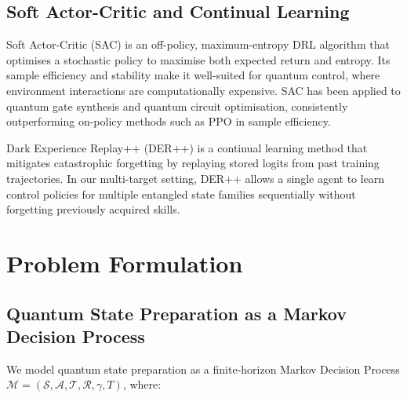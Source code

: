 \documentclass[twocolumn,superscriptaddress]{quantumarticle}
\begin{document}
\subsection{Soft Actor-Critic and Continual Learning}

Soft Actor-Critic (SAC) \cite{haarnoja2018soft} is an off-policy, maximum-entropy
DRL algorithm that optimises a stochastic policy to maximise both expected return
and entropy. Its sample efficiency and stability make it well-suited for quantum
control, where environment interactions are computationally expensive. SAC has been
applied to quantum gate synthesis \cite{ding2023designing} and quantum circuit
optimisation, consistently outperforming on-policy methods such as PPO in
sample efficiency.

Dark Experience Replay++ (DER++) \cite{buzzega2020dark} is a continual learning
method that mitigates catastrophic forgetting by replaying stored logits from past
training trajectories. In our multi-target setting, DER++ allows a single agent to
learn control policies for multiple entangled state families sequentially without
forgetting previously acquired skills.

\section{Problem Formulation}
\label{sec:problem}

\subsection{Quantum State Preparation as a Markov Decision Process}

We model quantum state preparation as a finite-horizon Markov Decision Process
$\mathcal{M} = (\mathcal{S}, \mathcal{A}, \mathcal{T}, \mathcal{R}, \gamma, T)$,
where:
\end{document}
